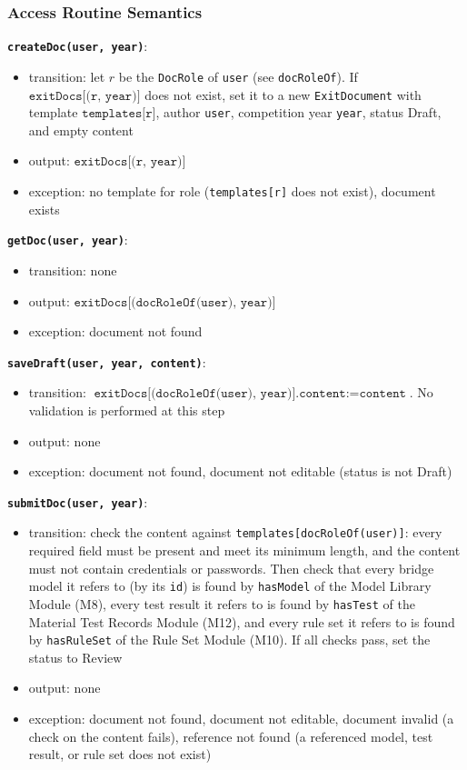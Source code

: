\documentclass[12pt, titlepage]{article}
\begin{document}
\subsubsection{Access Routine Semantics}

\textbf{\texttt{createDoc(user, year)}}:
\begin{itemize}
  \item transition: let $r$ be the \texttt{DocRole} of \texttt{user} (see \texttt{docRoleOf}). If $\texttt{exitDocs[(r, year)]}$ does not exist, set it to a new \texttt{ExitDocument} with template $\texttt{templates[r]}$, author \texttt{user}, competition year \texttt{year}, status Draft, and empty content
  \item output: $\texttt{exitDocs[(r, year)]}$
  \item exception: no template for role (\texttt{templates[r]} does not exist), document exists
\end{itemize}

\textbf{\texttt{getDoc(user, year)}}:
\begin{itemize}
  \item transition: none
  \item output: $\texttt{exitDocs[(docRoleOf(user), year)]}$
  \item exception: document not found
\end{itemize}

\textbf{\texttt{saveDraft(user, year, content)}}:
\begin{itemize}
  \item transition: $\texttt{exitDocs[(docRoleOf(user), year)].content} := \texttt{content}$. No validation is performed at this step
  \item output: none
  \item exception: document not found, document not editable (status is not Draft)
\end{itemize}

\textbf{\texttt{submitDoc(user, year)}}:
\begin{itemize}
  \item transition: check the content against \texttt{templates[docRoleOf(user)]}: every required field must be present and meet its minimum length, and the content must not contain credentials or passwords. Then check that every bridge model it refers to (by its \texttt{id}) is found by \texttt{hasModel} of the Model Library Module (M8), every test result it refers to is found by \texttt{hasTest} of the Material Test Records Module (M12), and every rule set it refers to is found by \texttt{hasRuleSet} of the Rule Set Module (M10). If all checks pass, set the status to Review
  \item output: none
  \item exception: document not found, document not editable, document invalid (a check on the content fails), reference not found (a referenced model, test result, or rule set does not exist)
\end{itemize}
\end{document}
